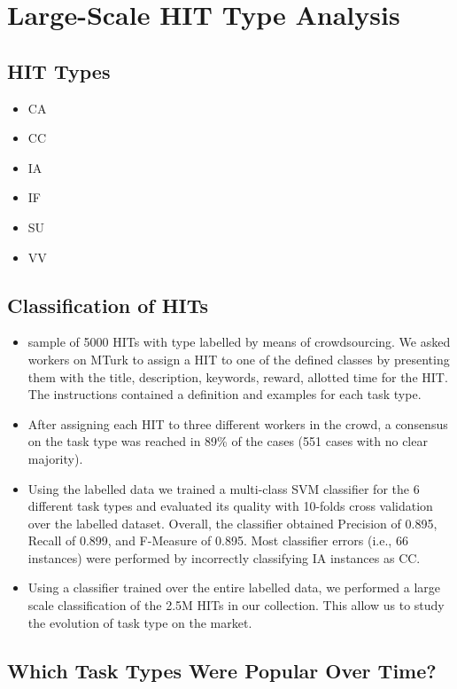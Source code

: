 \section{Large-Scale HIT Type Analysis}\label{sec:type}

\subsection{HIT Types}
\begin{itemize}

	\item CA

	\item CC

	\item IA

	\item IF

	\item SU

	\item VV

\end{itemize}

\subsection{Classification of HITs}
\begin{itemize}

	\item sample of 5000 HITs with type labelled by means of crowdsourcing. We asked workers on MTurk to assign a HIT to one of the defined classes by presenting them with the title, description, keywords, reward, allotted time for the HIT. The instructions contained a definition and examples for each task type.

	\item After assigning each HIT to three different workers in the crowd, a consensus on the task type was reached in 89\% of the cases (551 cases with no clear majority).

	\item Using the labelled data we trained a multi-class SVM classifier for the 6 different task types and evaluated its quality with 10-folds cross validation over the labelled dataset. Overall, the classifier obtained Precision of 0.895, Recall of 0.899, and F-Measure of 0.895. Most classifier errors (i.e., 66 instances) were performed by incorrectly classifying IA instances as CC.

	\item Using a classifier trained over the entire labelled data, we performed a large scale classification of the 2.5M HITs in our collection. This allow us to study the evolution of task type on the market.

\end{itemize}


\subsection{Which Task Types Were Popular Over Time?}